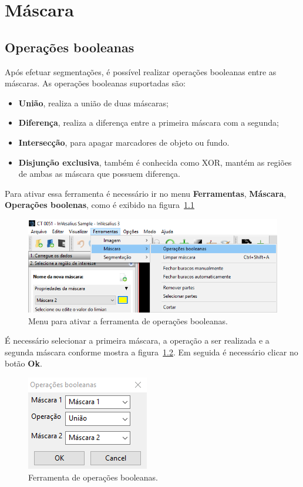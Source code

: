 \chapter{Máscara}


\section{Operações booleanas}

Após efetuar segmentações, é possível realizar operações booleanas entre as máscaras. As operações booleanas suportadas são:

\begin{itemize}
	\item \textbf{União}, realiza a união de duas máscaras;
	\item \textbf{Diferença}, realiza a diferença entre a primeira máscara com a segunda;
	\item \textbf{Intersecção}, para apagar marcadores de objeto ou fundo.
	\item \textbf{Disjunção exclusiva}, também é conhecida como XOR, mantém as regiões de ambas as máscara que possuem diferença.
\end{itemize}

Para ativar essa ferramenta é necessário ir no menu \textbf{Ferramentas}, \textbf{Máscara}, \textbf{Operações boolenas}, como é exibido na figura~\ref{fig:booleano_menu} 

\begin{figure}[!htb]
\centering
\includegraphics[scale=0.5]{../user_guide_figures/invesalius_screen/mask_operation_boolean_menu_pt.png}
\caption{Menu para ativar a ferramenta de operações booleanas.}
\label{fig:booleano_menu}
\end{figure}

É necessário selecionar a primeira máscara, a operação a ser realizada e a segunda máscara conforme mostra a figura~\ref{fig:booleano_janela}. Em seguida é necessário clicar no botão \textbf{Ok}.

\begin{figure}[!htb]
\centering
\includegraphics[scale=0.5]{../user_guide_figures/invesalius_screen/mask_boolean_dialog_pt.png}
\caption{Ferramenta de operações booleanas.}
\label{fig:booleano_janela}
\end{figure}

